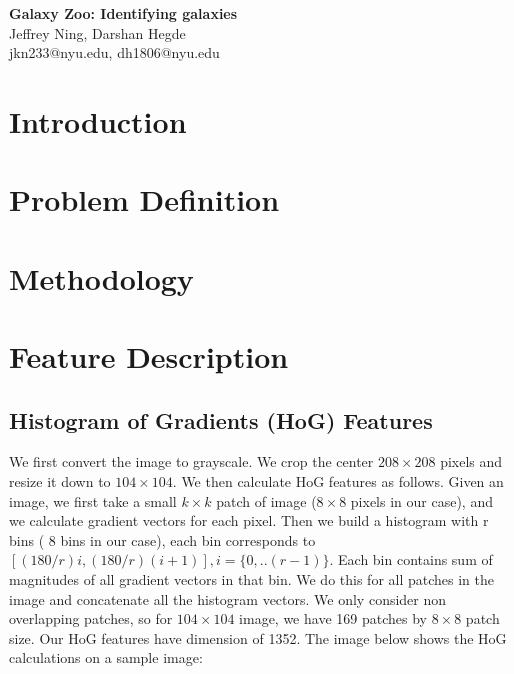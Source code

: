 \documentclass[10pt]{article}
\date{05/16/2014}
\begin{document}
\begin{flushleft}
{\Large
\textbf{Galaxy Zoo: Identifying galaxies}
}
\\
Jeffrey Ning, 
Darshan Hegde 
\\
jkn233@nyu.edu, dh1806@nyu.edu
\end{flushleft}

\section*{Introduction}


\section*{Problem Definition}

\section*{Methodology}

\section*{Feature Description}

\subsection*{Histogram of Gradients (HoG) Features}
We first convert the image to grayscale. We crop the center $ 208 \times 208 $ pixels and resize it down to $104 \times 104$. We then calculate HoG features as follows. Given an image, we first take a small $k \times k$ patch of image ($8 \times 8$ pixels in our case), and we calculate gradient vectors for each pixel. Then we build a histogram with r bins ( 8 bins in our case), each bin corresponds to ${[(180/r)i, (180/r)(i+1)]} , i=\{0, .. (r-1)\}$. Each bin contains sum of magnitudes of all gradient vectors in that bin. We do this for all patches in the image and concatenate all the histogram vectors. We only consider non overlapping patches, so for $104 \times 104$ image, we have 169 patches by $8 \times 8$ patch size. Our HoG features have dimension of 1352. The image below shows the HoG calculations on a sample image: 
\end{document}

